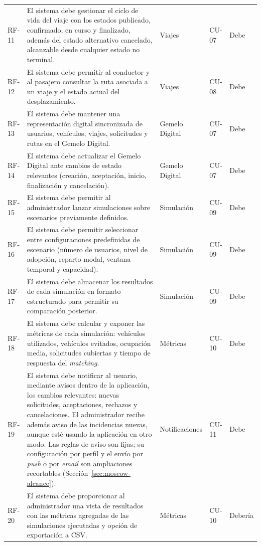 \begin{longtable}{p{1.2cm} p{7.0cm} p{2.7cm} p{1.3cm} p{1.6cm}}
  RF-11 & El sistema debe gestionar el ciclo de vida del viaje con los estados publicado, confirmado, en curso y finalizado, además del estado alternativo cancelado, alcanzable desde cualquier estado no terminal. & Viajes & CU-07 & Debe \\
  RF-12 & El sistema debe permitir al conductor y al pasajero consultar la ruta asociada a un viaje y el estado actual del desplazamiento. & Viajes & CU-08 & Debe \\
  RF-13 & El sistema debe mantener una representación digital sincronizada de usuarios, vehículos, viajes, solicitudes y rutas en el Gemelo Digital. & Gemelo Digital & CU-07 & Debe \\
  RF-14 & El sistema debe actualizar el Gemelo Digital ante cambios de estado relevantes (creación, aceptación, inicio, finalización y cancelación). & Gemelo Digital & CU-07 & Debe \\
  RF-15 & El sistema debe permitir al administrador lanzar simulaciones sobre escenarios previamente definidos. & Simulación & CU-09 & Debe \\
  RF-16 & El sistema debe permitir seleccionar entre configuraciones predefinidas de escenario (número de usuarios, nivel de adopción, reparto modal, ventana temporal y capacidad). & Simulación & CU-09 & Debe \\
  RF-17 & El sistema debe almacenar los resultados de cada simulación en formato estructurado para permitir su comparación posterior. & Simulación & CU-09 & Debe \\
  RF-18 & El sistema debe calcular y exponer las métricas de cada simulación: vehículos utilizados, vehículos evitados, ocupación media, solicitudes cubiertas y tiempo de respuesta del \textit{matching}. & Métricas & CU-10 & Debe \\
  RF-19 & El sistema debe notificar al usuario, mediante avisos dentro de la aplicación, los cambios relevantes: nuevas solicitudes, aceptaciones, rechazos y cancelaciones. El administrador recibe además aviso de las incidencias nuevas, aunque esté usando la aplicación en otro modo. Las reglas de aviso son fijas; su configuración por perfil y el envío por \textit{push} o por \textit{email} son ampliaciones recortables (Sección~\ref{sec:moscow-alcance}). & Notificaciones & CU-11 & Debe \\
  RF-20 & El sistema debe proporcionar al administrador una vista de resultados con las métricas agregadas de las simulaciones ejecutadas y opción de exportación a CSV. & Métricas & CU-10 & Debería \\

\end{longtable}
